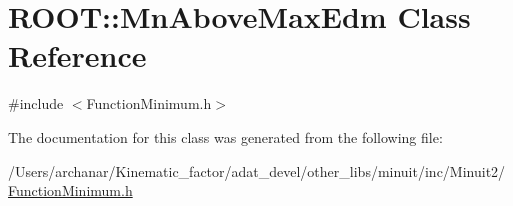 \hypertarget{classROOT_1_1Minuit2_1_1FunctionMinimum_1_1MnAboveMaxEdm}{}\section{R\+O\+OT\+:\+:Mn\+Above\+Max\+Edm Class Reference}
\label{classROOT_1_1Minuit2_1_1FunctionMinimum_1_1MnAboveMaxEdm}


{\ttfamily \#include $<$Function\+Minimum.\+h$>$}



The documentation for this class was generated from the following file\+:\begin{DoxyCompactItemize}
\item 
/\+Users/archanar/\+Kinematic\+\_\+factor/adat\+\_\+devel/other\+\_\+libs/minuit/inc/\+Minuit2/\mbox{\hyperlink{other__libs_2minuit_2inc_2Minuit2_2FunctionMinimum_8h}{Function\+Minimum.\+h}}\end{DoxyCompactItemize}
